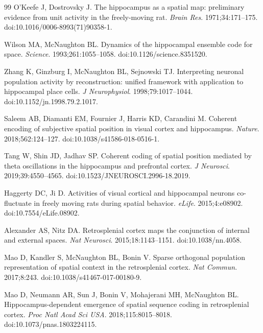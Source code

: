 \documentclass[10pt,twocolumn]{article}
\begin{document}
{\footnotesize
\setlength{\bibsep}{2pt}
\begin{thebibliography}{99}
O'Keefe J, Dostrovsky J. The hippocampus as a spatial map: preliminary evidence from unit activity in the freely-moving rat. \emph{Brain Res}. 1971;34:171--175. doi:10.1016/0006-8993(71)90358-1.

Wilson MA, McNaughton BL. Dynamics of the hippocampal ensemble code for space. \emph{Science}. 1993;261:1055--1058. doi:10.1126/science.8351520.

Zhang K, Ginzburg I, McNaughton BL, Sejnowski TJ. Interpreting neuronal population activity by reconstruction: unified framework with application to hippocampal place cells. \emph{J Neurophysiol}. 1998;79:1017--1044. doi:10.1152/jn.1998.79.2.1017.

Saleem AB, Diamanti EM, Fournier J, Harris KD, Carandini M. Coherent encoding of subjective spatial position in visual cortex and hippocampus. \emph{Nature}. 2018;562:124--127. doi:10.1038/s41586-018-0516-1.

Tang W, Shin JD, Jadhav SP. Coherent coding of spatial position mediated by theta oscillations in the hippocampus and prefrontal cortex. \emph{J Neurosci}. 2019;39:4550--4565. doi:10.1523/JNEUROSCI.2996-18.2019.

Haggerty DC, Ji D. Activities of visual cortical and hippocampal neurons co-fluctuate in freely moving rats during spatial behavior. \emph{eLife}. 2015;4:e08902. doi:10.7554/eLife.08902.

Alexander AS, Nitz DA. Retrosplenial cortex maps the conjunction of internal and external spaces. \emph{Nat Neurosci}. 2015;18:1143--1151. doi:10.1038/nn.4058.

Mao D, Kandler S, McNaughton BL, Bonin V. Sparse orthogonal population representation of spatial context in the retrosplenial cortex. \emph{Nat Commun}. 2017;8:243. doi:10.1038/s41467-017-00180-9.

Mao D, Neumann AR, Sun J, Bonin V, Mohajerani MH, McNaughton BL. Hippocampus-dependent emergence of spatial sequence coding in retrosplenial cortex. \emph{Proc Natl Acad Sci USA}. 2018;115:8015--8018. doi:10.1073/pnas.1803224115.


\end{thebibliography}}
\end{document}
